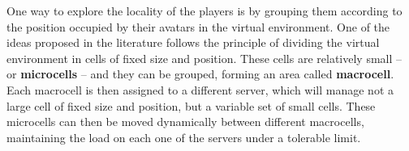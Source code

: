One way to explore the locality of the players is by grouping them according to the position occupied by their avatars in the virtual environment. %
%
%
%
%
One of the ideas proposed in the literature \cite{devleeschauwer2005dma} follows the principle of dividing the virtual environment in cells of fixed size and position. These cells are relatively small -- or \textbf{microcells} -- and they can be grouped, forming an area called \textbf{macrocell}. Each macrocell is then assigned to a different server, which will manage not a large cell of fixed size and position, but a variable set of small cells. These microcells can then be moved dynamically between different macrocells, maintaining the load on each one of the servers under a tolerable limit.


